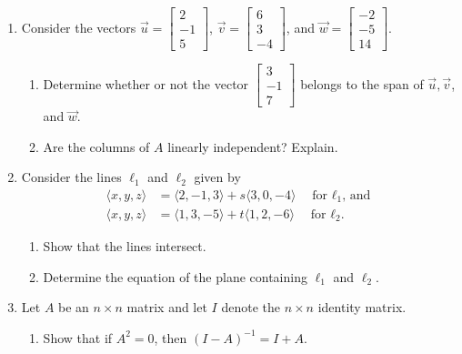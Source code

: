 \documentclass[12pt]{article}
\newcommand{\points}[1]{\marginpar{\hspace{24pt}[#1]}}
\newcommand{\bbm}{\begin{bmatrix}}
\newcommand{\ebm}{\end{bmatrix}}
\begin{document}
\begin{enumerate}
\newpage

\item Consider the vectors $\vec{u} = \bbm 2\\-1\\5\ebm$, $\vec{v} = \bbm 6\\3\\-4\ebm$, and $\vec{w} = \bbm -2\\-5\\14\ebm$.
\begin{enumerate}
 \item Determine whether or not the vector $\bbm 3\\-1\\7\ebm$ belongs to the span of $\vec{u}, \vec{v}$, and $\vec{w}$. \points{6}

\vspace{5.5in}

 \item Are the columns of $A$ linearly independent? Explain. \points{3}
\end{enumerate}

\newpage

\item Consider the lines $\ell_1$ and $\ell_2$ given by
\begin{align*}
 \langle x,y,z\rangle &= \langle 2, -1, 3\rangle + s\langle 3, 0, -4\rangle \quad \text{for $\ell_1$, and}\\
 \langle x,y,z\rangle & = \langle 1, 3, -5\rangle + t\langle 1, 2, -6\rangle \quad \text{for $\ell_2$.}
\end{align*}
\begin{enumerate}
 \item Show that the lines intersect. \points{4}

\vspace{3.5in}

 \item Determine the equation of the plane containing $\ell_1$ and $\ell_2$. \points{4}
\end{enumerate}

\newpage


 \item Let $A$ be an $n\times n$ matrix and let $I$ denote the $n\times n$ identity matrix.
\begin{enumerate}
 \item Show that if $A^2=0$, then $(I-A)^{-1} = I+A$. \points{2}

\vspace{2in}


\end{enumerate}
\end{enumerate}
\end{document}
